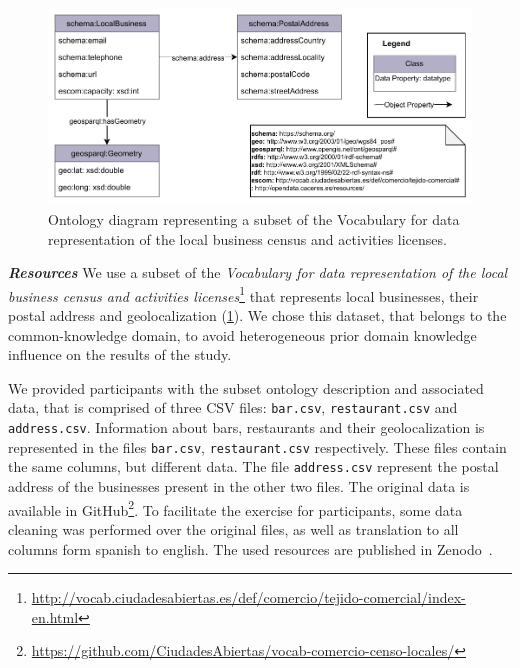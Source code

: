 \begin{figure}[!t]
\centering
\includegraphics[width=\linewidth]{figures/chp5-1_us_onto.pdf}
\caption[Ontology diagram for the user study exercise of Mapeathor]{Ontology diagram representing a subset of the Vocabulary for data representation of the local business census and activities licenses.}
\label{fig:chp5-1_us_onto}
\end{figure}

\noindent\textit{\textbf{Resources}}
We use a subset of the \textit{Vocabulary for data representation of the local business census and activities licenses}\footnote{\url{http://vocab.ciudadesabiertas.es/def/comercio/tejido-comercial/index-en.html}} that represents local businesses, their postal address and geolocalization (\cref{fig:chp5-1_us_onto}). 
We chose this dataset, that belongs to the common-knowledge domain, to avoid heterogeneous prior domain knowledge influence on the results of the study.

We provided participants with the subset ontology description and associated data, that is comprised of three CSV files: \texttt{bar.csv}, \texttt{restaurant.csv} and \texttt{address.csv}. Information about bars, restaurants and their geolocalization is represented in the files \texttt{bar.csv}, \texttt{restaurant.csv} respectively. 
These files contain the same columns, but different data. The file \texttt{address.csv} represent the postal address of the businesses present in the other two files. 
The original data is available in GitHub\footnote{\url{https://github.com/CiudadesAbiertas/vocab-comercio-censo-locales/}}. 
To facilitate the exercise for participants, some data cleaning was performed over the original files, as well as translation to all columns form spanish to english. The used resources are published in Zenodo~\parencite{iglesias-molina_2022_8154522}.



